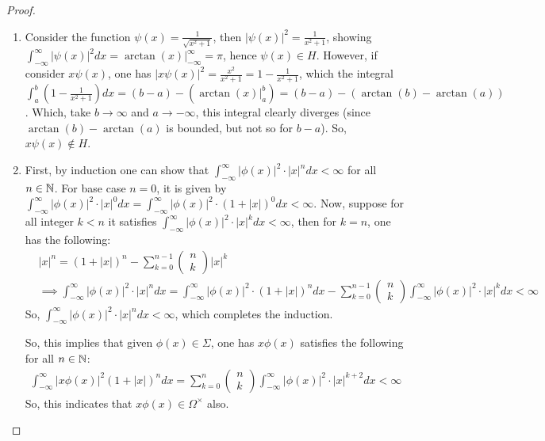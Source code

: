 \documentclass{article}
\begin{document}
\begin{proof}

    \hfil

    \begin{enumerate}
        \item Consider the function $\psi(x)=\frac{1}{\sqrt{x^2+1}}$, then $|\psi(x)|^2 = \frac{1}{x^2+1}$, showing $\int_{-\infty}^{\infty}|\psi(x)|^2dx = \arctan(x)\bigg|_{-\infty}^{\infty} = \pi$, hence $\psi(x)\in H$. However, if consider $x\psi(x)$, one has $|x\psi(x)|^2 = \frac{x^2}{x^2+1} = 1-\frac{1}{x^2+1}$, which the integral $\int_{a}^{b}\left(1-\frac{1}{x^2+1}\right)dx = (b-a) - \left(\arctan(x)\bigg|_{a}^{b}\right) = (b-a) - (\arctan(b)-\arctan(a))$. Which, take $b\rightarrow\infty$ and $a\rightarrow-\infty$, this integral clearly diverges (since $\arctan(b)-\arctan(a)$ is bounded, but not so for $b-a$). So, $x\psi(x)\notin H$.
        
        \hfil

        \item First, by induction one can show that $\int_{-\infty}^{\infty}|\phi(x)|^2\cdot|x|^n dx<\infty$ for all $n\in\mathbb{N}$. For base case $n=0$, it is given by $\int_{-\infty}^{\infty}|\phi(x)|^2 \cdot |x|^0dx = \int_{-\infty}^{\infty}|\phi(x)|^2\cdot (1+|x|)^0 dx < \infty$. Now, suppose for all integer $k<n$ it satisfies $\int_{-\infty}^{\infty}|\phi(x)|^2 \cdot|x|^kdx < \infty$, then for $k=n$, one has the following:
        \begin{align}
            &|x|^n = (1+|x|)^n - \sum_{k=0}^{n-1}\begin{pmatrix}
                n\\k
            \end{pmatrix}|x|^k\\ 
            &\implies \int_{-\infty}^{\infty}|\phi(x)|^2 \cdot |x|^n dx = \int_{-\infty}^{\infty}|\phi(x)|^2 \cdot (1+|x|)^n dx - \sum_{k=0}^{n-1} \begin{pmatrix}
                n\\k
            \end{pmatrix}\int_{-\infty}^{\infty}|\phi(x)|^2 \cdot |x|^k dx < \infty
        \end{align}
        So, $\int_{-\infty}^{\infty}|\phi(x)|^2 \cdot |x|^n dx < \infty$, which completes the induction.

        So, this implies that given $\phi(x)\in\Sigma$, one has $x\phi(x)$ satisfies the following for all $n\in\mathbb{N}$:
        \begin{align}
            \int_{-\infty}^{\infty}|x\phi(x)|^2 (1+|x|)^n dx = \sum_{k=0}^{n}\begin{pmatrix}
                n\\k
            \end{pmatrix}\int_{-\infty}^{\infty}|\phi(x)|^2 \cdot |x|^{k+2}dx < \infty
        \end{align}
        So, this indicates that $x\phi(x)\in \Omega^\times$ also.


\end{enumerate}
\end{proof}
\end{document}
